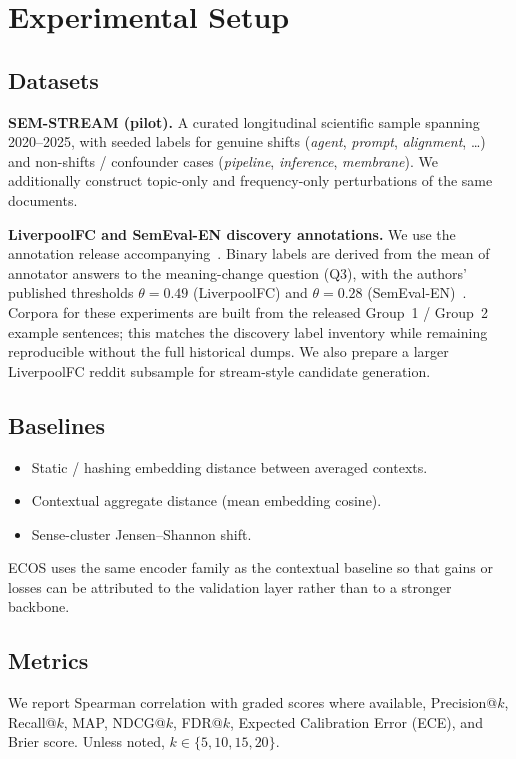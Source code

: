 \documentclass{llncs}
\begin{document}
\section{Experimental Setup}
\label{sec:setup}

\subsection{Datasets}
\textbf{SEM-STREAM (pilot).}
A curated longitudinal scientific sample spanning 2020--2025, with seeded labels for genuine shifts (\textit{agent}, \textit{prompt}, \textit{alignment}, \ldots) and non-shifts / confounder cases (\textit{pipeline}, \textit{inference}, \textit{membrane}).
We additionally construct topic-only and frequency-only perturbations of the same documents.

\textbf{LiverpoolFC and SemEval-EN discovery annotations.}
We use the annotation release accompanying~\cite{umarova2025discovery}.
Binary labels are derived from the mean of annotator answers to the meaning-change question (Q3), with the authors' published thresholds $\theta=0.49$ (LiverpoolFC) and $\theta=0.28$ (SemEval-EN)~\cite{kurup2025truth}.
Corpora for these experiments are built from the released Group~1 / Group~2 example sentences; this matches the discovery label inventory while remaining reproducible without the full historical dumps.
We also prepare a larger LiverpoolFC reddit subsample for stream-style candidate generation.

\subsection{Baselines}
\begin{itemize}
\item Static / hashing embedding distance between averaged contexts.
\item Contextual aggregate distance (mean embedding cosine).
\item Sense-cluster Jensen--Shannon shift.
\end{itemize}
ECOS uses the same encoder family as the contextual baseline so that gains or losses can be attributed to the validation layer rather than to a stronger backbone.

\subsection{Metrics}
We report Spearman correlation with graded scores where available, Precision@$k$, Recall@$k$, MAP, NDCG@$k$, FDR@$k$, Expected Calibration Error (ECE), and Brier score.
Unless noted, $k\in\{5,10,15,20\}$.
\end{document}
